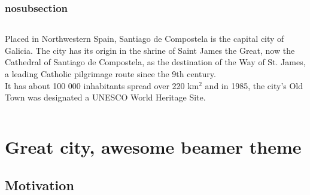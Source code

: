\documentclass[aspectratio=169]{beamer}
\begin{document}
\begin{frame}[backgroundpicture=fig/scq_map_street]
\frametitle{nosubsection}

\begin{columns}
  \begin{column}{0.34\textwidth}
    Placed in Northwestern Spain, Santiago de Compostela is the capital city of Galicia.
    The city has its origin in the shrine of Saint James the Great, now the Cathedral of Santiago de Compostela, as the destination of the Way of St. James, a leading Catholic pilgrimage route since the 9th century.\\[5mm]
    It has about 100 000 inhabitants spread over 220 km${}^2$
    and in 1985, the city's Old Town was designated a UNESCO World Heritage Site.
  \end{column}
  \hspace*{9.5cm}
\end{columns}

\end{frame}












\section{Great city, awesome beamer theme}
\subsection{Motivation}
\end{document}
